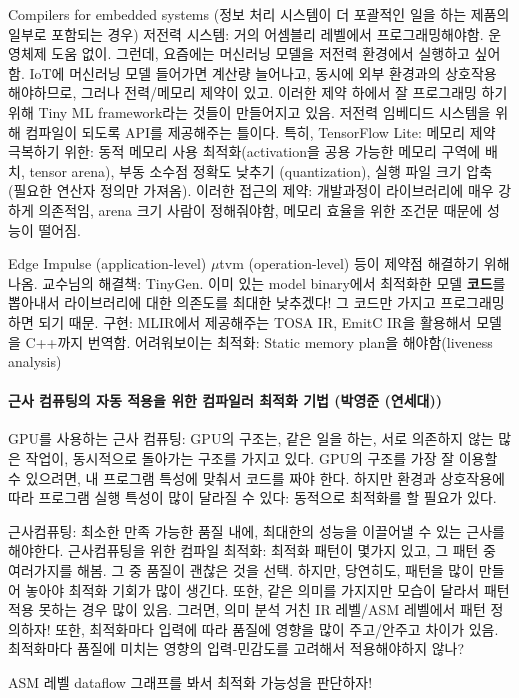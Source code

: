 \documentclass{article}
\begin{document}
Compilers for embedded systems (정보 처리 시스템이 더 포괄적인 일을 하는 제품의 일부로 포함되는 경우)
저전력 시스템: 거의 어셈블리 레벨에서 프로그래밍해야함. 운영체제 도움 없이.
그런데, 요즘에는 머신러닝 모델을 저전력 환경에서 실행하고 싶어함.
IoT에 머신러닝 모델 들어가면 계산량 늘어나고, 동시에 외부 환경과의 상호작용 해야하므로, 그러나 전력/메모리 제약이 있고.
이러한 제약 하에서 잘 프로그래밍 하기 위해 Tiny ML framework라는 것들이 만들어지고 있음.
저전력 임베디드 시스템을 위해 컴파일이 되도록 API를 제공해주는 틀이다.
특히, TensorFlow Lite: 메모리 제약 극복하기 위한: 동적 메모리 사용 최적화(activation을 공용 가능한 메모리 구역에 배치, tensor arena), 부동 소수점 정확도 낮추기 (quantization), 실행 파일 크기 압축 (필요한 연산자 정의만 가져옴).
이러한 접근의 제약: 개발과정이 라이브러리에 매우 강하게 의존적임, arena 크기 사람이 정해줘야함, 메모리 효율을 위한 조건문 때문에 성능이 떨어짐.

Edge Impulse (application-level) $\mu$tvm (operation-level) 등이 제약점 해결하기 위해 나옴.
교수님의 해결책: TinyGen. 이미 있는 model binary에서 최적화한 모델 \textbf{코드}를 뽑아내서 라이브러리에 대한 의존도를 최대한 낮추겠다!
그 코드만 가지고 프로그래밍하면 되기 때문.
구현: MLIR에서 제공해주는 TOSA IR, EmitC IR을 활용해서 모델을 C++까지 번역함.
어려워보이는 최적화: Static memory plan을 해야함(liveness analysis)
\paragraph{근사 컴퓨팅의 자동 적용을 위한 컴파일러 최적화 기법 (박영준 (연세대))}
GPU를 사용하는 근사 컴퓨팅: GPU의 구조는, 같은 일을 하는, 서로 의존하지 않는 많은 작업이, 동시적으로 돌아가는 구조를 가지고 있다.
GPU의 구조를 가장 잘 이용할 수 있으려면, 내 프로그램 특성에 맞춰서 코드를 짜야 한다.
하지만 환경과 상호작용에 따라 프로그램 실행 특성이 많이 달라질 수 있다: 동적으로 최적화를 할 필요가 있다.

근사컴퓨팅: 최소한 만족 가능한 품질 내에, 최대한의 성능을 이끌어낼 수 있는 근사를 해야한다.
근사컴퓨팅을 위한 컴파일 최적화: 최적화 패턴이 몇가지 있고, 그 패턴 중 여러가지를 해봄. 그 중 품질이 괜찮은 것을 선택.
하지만, 당연히도, 패턴을 많이 만들어 놓아야 최적화 기회가 많이 생긴다.
또한, 같은 의미를 가지지만 모습이 달라서 패턴 적용 못하는 경우 많이 있음. 그러면, 의미 분석 거친 IR 레벨/ASM 레벨에서 패턴 정의하자!
또한, 최적화마다 입력에 따라 품질에 영향을 많이 주고/안주고 차이가 있음. 최적화마다 품질에 미치는 영향의 입력-민감도를 고려해서 적용해야하지 않나?

ASM 레벨 dataflow 그래프를 봐서 최적화 가능성을 판단하자!
\end{document}
